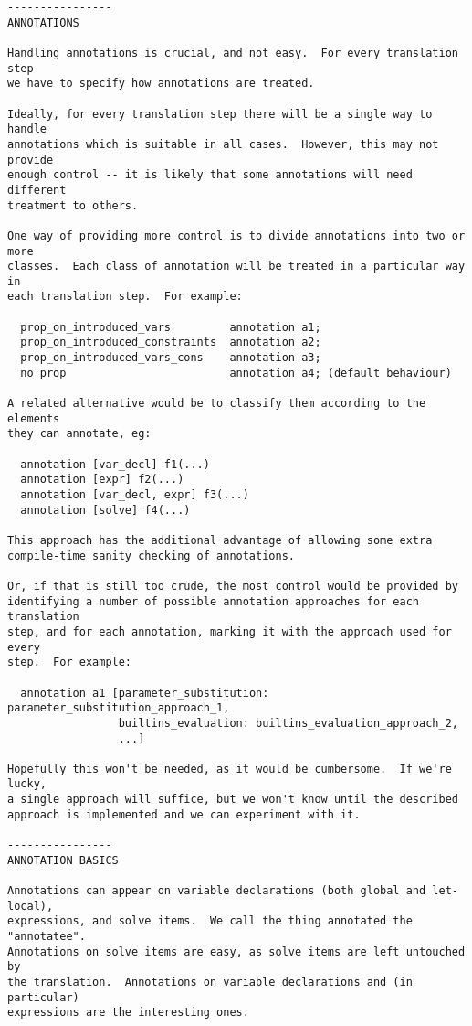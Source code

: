 \documentclass[10pt]{article}
\begin{document}
\begin{verbatim}
----------------
ANNOTATIONS

Handling annotations is crucial, and not easy.  For every translation step
we have to specify how annotations are treated.

Ideally, for every translation step there will be a single way to handle
annotations which is suitable in all cases.  However, this may not provide
enough control -- it is likely that some annotations will need different
treatment to others.

One way of providing more control is to divide annotations into two or more
classes.  Each class of annotation will be treated in a particular way in
each translation step.  For example:

  prop_on_introduced_vars         annotation a1;
  prop_on_introduced_constraints  annotation a2;
  prop_on_introduced_vars_cons    annotation a3;
  no_prop                         annotation a4; (default behaviour)

A related alternative would be to classify them according to the elements
they can annotate, eg:

  annotation [var_decl] f1(...)
  annotation [expr] f2(...)
  annotation [var_decl, expr] f3(...)
  annotation [solve] f4(...)

This approach has the additional advantage of allowing some extra
compile-time sanity checking of annotations.

Or, if that is still too crude, the most control would be provided by
identifying a number of possible annotation approaches for each translation
step, and for each annotation, marking it with the approach used for every
step.  For example:

  annotation a1 [parameter_substitution: parameter_substitution_approach_1,
                 builtins_evaluation: builtins_evaluation_approach_2,
                 ...]

Hopefully this won't be needed, as it would be cumbersome.  If we're lucky,
a single approach will suffice, but we won't know until the described
approach is implemented and we can experiment with it.

----------------
ANNOTATION BASICS

Annotations can appear on variable declarations (both global and let-local),
expressions, and solve items.  We call the thing annotated the "annotatee".
Annotations on solve items are easy, as solve items are left untouched by
the translation.  Annotations on variable declarations and (in particular)
expressions are the interesting ones.


\end{verbatim}
\end{document}
